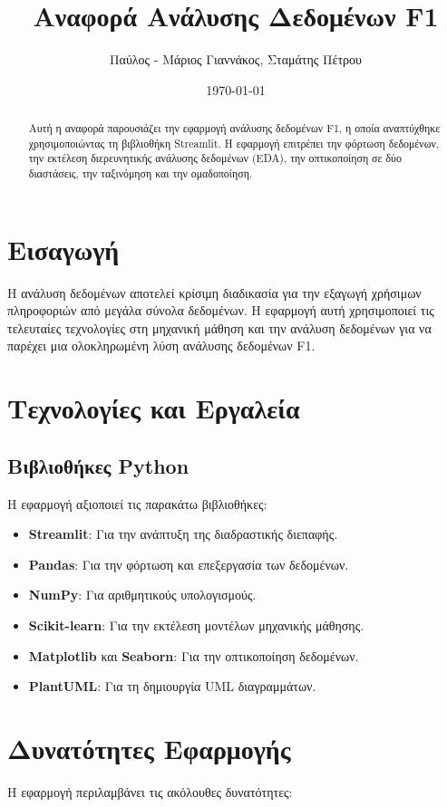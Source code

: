 \documentclass{article}
\title{Αναφορά Ανάλυσης Δεδομένων F1}
\author{Παύλος - Μάριος Γιαννάκος, Σταμάτης Πέτρου}
\date{\today}
\begin{document}
\maketitle

\begin{abstract}
Αυτή η αναφορά παρουσιάζει την εφαρμογή ανάλυσης δεδομένων F1, η οποία αναπτύχθηκε χρησιμοποιώντας τη βιβλιοθήκη Streamlit. Η εφαρμογή επιτρέπει την φόρτωση δεδομένων, την εκτέλεση διερευνητικής ανάλυσης δεδομένων (EDA), την οπτικοποίηση σε δύο διαστάσεις, την ταξινόμηση και την ομαδοποίηση.
\end{abstract}

\section{Εισαγωγή}
Η ανάλυση δεδομένων αποτελεί κρίσιμη διαδικασία για την εξαγωγή χρήσιμων πληροφοριών από μεγάλα σύνολα δεδομένων. Η εφαρμογή αυτή χρησιμοποιεί τις τελευταίες τεχνολογίες στη μηχανική μάθηση και την ανάλυση δεδομένων για να παρέχει μια ολοκληρωμένη λύση ανάλυσης δεδομένων F1.

\section{Τεχνολογίες και Εργαλεία}
\subsection{Βιβλιοθήκες Python}
Η εφαρμογή αξιοποιεί τις παρακάτω βιβλιοθήκες:
\begin{itemize}
    \item \textbf{Streamlit}: Για την ανάπτυξη της διαδραστικής διεπαφής.
    \item \textbf{Pandas}: Για την φόρτωση και επεξεργασία των δεδομένων.
    \item \textbf{NumPy}: Για αριθμητικούς υπολογισμούς.
    \item \textbf{Scikit-learn}: Για την εκτέλεση μοντέλων μηχανικής μάθησης.
    \item \textbf{Matplotlib} και \textbf{Seaborn}: Για την οπτικοποίηση δεδομένων.
    \item \textbf{PlantUML}: Για τη δημιουργία UML διαγραμμάτων.
\end{itemize}

\section{Δυνατότητες Εφαρμογής}
Η εφαρμογή περιλαμβάνει τις ακόλουθες δυνατότητες:
\end{document}
